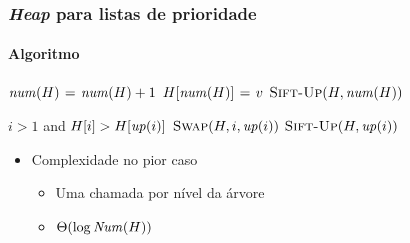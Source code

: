 \documentclass{beamer}
\begin{document}
\begin{frame}
  \frametitle{\textit{Heap} para listas de prioridade}
  \framesubtitle{Algoritmo}

\begin{codebox}
\zi \Comment {}
\li $\id{num}(H) \gets \id{num}(H) + 1$
\li $H[\id{num}(H)] \gets v$
\li $\proc{Sift-Up}(H, \id{num}(H))$
    \End
\end{codebox}

\begin{codebox}
\li \If $i > 1$ and $H[i] > H[\id{up}(i)]$
\li   \Then
        $\proc{Swap}(H, i, \id{up}(i))$
\li     $\proc{Sift-Up}(H, \id{up}(i))$
    \End
\end{codebox}

\begin{itemize}
\item Complexidade no pior caso
\begin{itemize}
  \item Uma chamada por nível da árvore
  \item $\Theta(\log \id{Num}(H))$
\end{itemize}
\end{itemize}
\end{frame}
\end{document}
